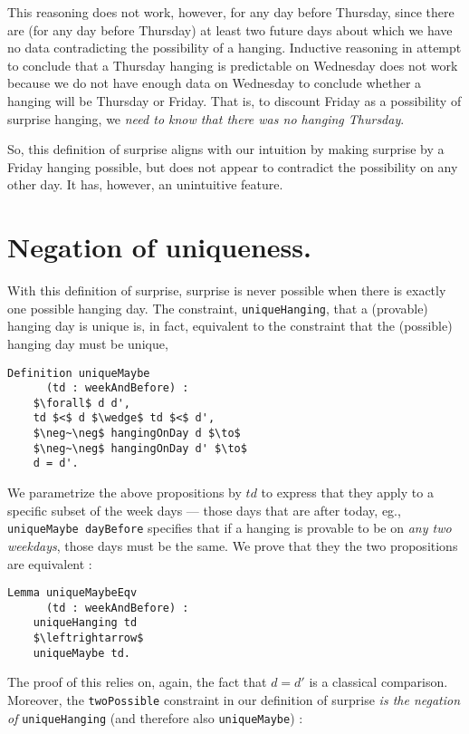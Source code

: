\documentclass[journal]{journal}
\begin{document}
This reasoning does not work, however, for any
day before Thursday, since there are (for any day before Thursday) at least two future
days about which we have no
data contradicting the possibility of a hanging.
Inductive reasoning in attempt to conclude that a Thursday hanging is
predictable on Wednesday does not work because we do not have enough data on Wednesday
to conclude whether a hanging will be Thursday or Friday. That is, to discount Friday
as a possibility of surprise hanging, we \emph{need to know that there was no
hanging Thursday}.

So, this definition of surprise aligns with our intuition by making surprise
by a Friday hanging possible, but does not appear to contradict the possibility
on any other day. It has, however, an unintuitive feature.

\section{Negation of uniqueness. }
\label{sec:unique}

With this definition of surprise, surprise is never possible when there is
exactly one possible hanging day. The constraint, {\tt uniqueHanging}, that
a (provable) hanging day is unique is, in fact, equivalent to the constraint
that the (possible) hanging day must be unique,

\begin{lstlisting}[mathescape=true]
  Definition uniqueMaybe
      (td : weekAndBefore) :
    $\forall$ d d',
    td $<$ d $\wedge$ td $<$ d',
    $\neg~\neg$ hangingOnDay d $\to$
    $\neg~\neg$ hangingOnDay d' $\to$
    d = d'.
\end{lstlisting}

We parametrize the above propositions by $td$ to express that they apply to
a specific subset of the week days --- those days that are after today,
eg., {\tt uniqueMaybe dayBefore} specifies that if a hanging is provable to be
on \emph{any two weekdays}, those days must be the same.
We prove that they the two propositions are equivalent :

\begin{lstlisting}[mathescape=true]
  Lemma uniqueMaybeEqv
      (td : weekAndBefore) :
    uniqueHanging td
    $\leftrightarrow$
    uniqueMaybe td.
\end{lstlisting}

The proof of this relies on, again, the fact that $d = d'$ is a classical
comparison. Moreover, the {\tt twoPossible} constraint
in our definition of surprise \emph{is the negation of} {\tt uniqueHanging}
(and therefore also {\tt uniqueMaybe}) :
\end{document}

